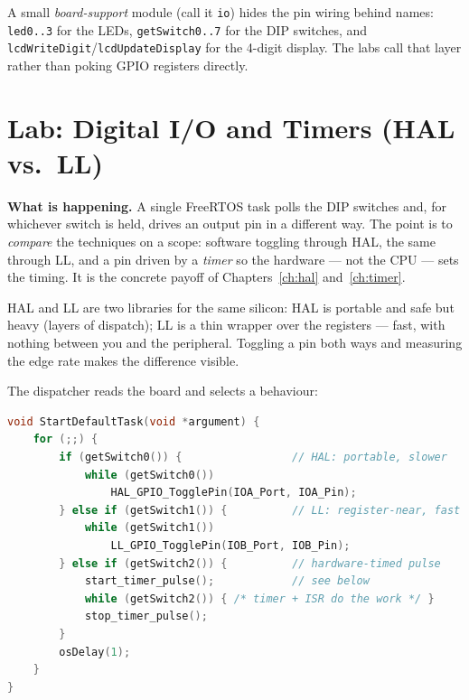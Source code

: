 \documentclass[11pt,a4paper,oneside]{book}
\newcommand{\code}[1]{\texttt{#1}}
\begin{document}
\begin{note}
A small \emph{board-support} module (call it \code{io}) hides the pin wiring behind
names: \code{led0..3} for the LEDs, \code{getSwitch0..7} for the DIP switches, and
\code{lcdWriteDigit}/\code{lcdUpdateDisplay} for the 4-digit display. The labs call
that layer rather than poking GPIO registers directly.
\end{note}

\chapter{Lab: Digital I/O and Timers (HAL vs.\ LL)}\label{ch:lab-gpio}

\textbf{What is happening.} A single FreeRTOS task polls the DIP switches and, for
whichever switch is held, drives an output pin in a different way. The point is to
\emph{compare} the techniques on a scope: software toggling through HAL, the same
through LL, and a pin driven by a \emph{timer} so the hardware --- not the CPU ---
sets the timing. It is the concrete payoff of Chapters~\ref{ch:hal}
and~\ref{ch:timer}.

\begin{keyidea}
HAL and LL are two libraries for the same silicon: HAL is portable and safe but
heavy (layers of dispatch); LL is a thin wrapper over the registers --- fast, with
nothing between you and the peripheral. Toggling a pin both ways and measuring the
edge rate makes the difference visible.
\end{keyidea}

The dispatcher reads the board and selects a behaviour:

\begin{lstlisting}[language=C,caption={Suggested skeleton: switch-dispatched I/O task.}]
void StartDefaultTask(void *argument) {
    for (;;) {
        if (getSwitch0()) {                 // HAL: portable, slower
            while (getSwitch0())
                HAL_GPIO_TogglePin(IOA_Port, IOA_Pin);
        } else if (getSwitch1()) {          // LL: register-near, fast
            while (getSwitch1())
                LL_GPIO_TogglePin(IOB_Port, IOB_Pin);
        } else if (getSwitch2()) {          // hardware-timed pulse
            start_timer_pulse();            // see below
            while (getSwitch2()) { /* timer + ISR do the work */ }
            stop_timer_pulse();
        }
        osDelay(1);
    }
}
\end{lstlisting}
\end{document}
